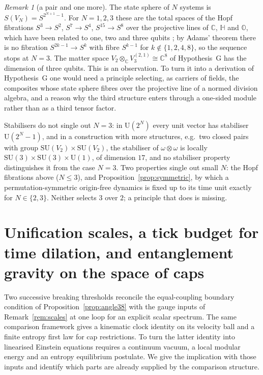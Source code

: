 \documentclass[aps,pra,onecolumn,superscriptaddress,nofootinbib,10pt]{revtex4-2}
\theoremstyle{definition}
\theoremstyle{remark}
\newtheorem{remark}[theorem]{Remark}
\newcommand{\C}{\mathbb{C}}
\newcommand{\HH}{\mathbb{H}}
\newcommand{\SU}{\mathrm{SU}}
\newcommand{\U}{\mathrm{U}}
\begin{document}
\begin{remark}[a pair and one more]\label{rem:hopf}
The state sphere of $N$ systems is $S(V_N)=S^{2^{N+1}-1}$.  For $N=1,2,3$ these are the total spaces of
the Hopf fibrations $S^3\to S^2$, $S^7\to S^4$, $S^{15}\to S^8$ over the projective lines of $\C$, $\HH$ and
$\mathbb O$, which have been related to one, two and three qubits \cite{MD,BC}; by Adams' theorem
\cite{Adams} there is no fibration $S^{2k-1}\to S^k$ with fibre $S^{k-1}$ for $k\notin\{1,2,4,8\}$, so the
sequence stops at $N=3$.  The matter space $V_2\otimes_\C V_3^{(2,1)}\cong\C^8$ of Hypothesis~G has the
dimension of three qubits.  This is an observation.  To turn it into a derivation of Hypothesis~G one
would need a principle selecting, as carriers of fields, the composites whose state sphere fibres over
the projective line of a normed division algebra, and a reason why the third structure enters through
a one-sided module rather than as a third tensor factor.

Stabilisers do not single out $N=3$: in $\U(2^N)$ every unit vector has stabiliser $\U(2^N-1)$, and in
a construction with more structures, e.g.\ two closed pairs with group $\SU(V_2)\times\SU(V_2)$, the
stabiliser of $\omega\otimes\omega$ is locally $\SU(3)\times\SU(3)\times\U(1)$, of dimension $17$, and no
stabiliser property distinguishes it from the case $N=3$.  Two properties single out small $N$: the Hopf fibrations above ($N\le3$), and
Proposition~\ref{prop:symmetric}, by which a permutation-symmetric origin-free dynamics is fixed up to
its time unit exactly for $N\in\{2,3\}$.  Neither selects $3$ over $2$; a principle that does is missing.
\end{remark}


\section{Unification scales, a tick budget for time dilation, and entanglement gravity on the space of caps}\label{sec:unification}

Two successive breaking thresholds reconcile the equal-coupling boundary condition of
Proposition~\ref{prop:angle38} with the gauge inputs of Remark~\ref{rem:scales}
at one loop for an explicit scalar spectrum. The same comparison framework gives
a kinematic clock identity on its velocity ball and a finite entropy first law
for cap restrictions. To turn the latter identity into linearised Einstein
equations requires a continuum vacuum, a local modular energy and an entropy
equilibrium postulate. We give the implication with those inputs and identify
which parts are already supplied by the comparison structure.
\end{document}
